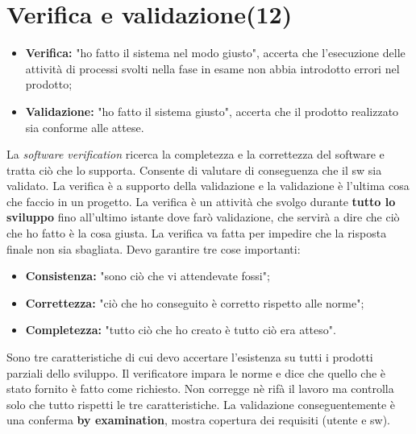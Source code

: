 



\section{Verifica e validazione(12)}


\begin{itemize}

	\item \textbf{Verifica:} "ho fatto il sistema nel modo giusto", accerta che l'esecuzione delle attività di processi svolti nella fase in esame non abbia introdotto errori nel prodotto;
	\item \textbf{Validazione:} "ho fatto il sistema giusto", accerta che il prodotto realizzato sia conforme alle attese.

\end{itemize}

La \textit{software verification} ricerca la completezza e la correttezza del software e tratta ciò che lo supporta. Consente di valutare di conseguenza che il sw sia validato. La verifica è a supporto della validazione e la validazione è l'ultima cosa che faccio in un progetto. La verifica è un attività che svolgo durante \textbf{tutto lo sviluppo} fino all'ultimo istante dove farò validazione, che servirà a dire che ciò che ho fatto è la cosa giusta. La verifica va fatta per impedire che la risposta finale non sia sbagliata. Devo garantire tre cose importanti:

\begin{itemize}

	\item \textbf{Consistenza:} "sono ciò che vi attendevate fossi";
	\item \textbf{Correttezza:} "ciò che ho conseguito è corretto rispetto alle norme";
	\item \textbf{Completezza:} "tutto ciò che ho creato è tutto ciò era atteso".

\end{itemize}

Sono tre caratteristiche di cui devo accertare l'esistenza su tutti i prodotti parziali dello sviluppo. Il verificatore impara le norme e dice che quello che è stato fornito è fatto come richiesto. Non corregge nè rifà il lavoro ma controlla solo che tutto rispetti le tre caratteristiche. La validazione conseguentemente è una conferma \textbf{by examination}, mostra copertura dei requisiti (utente e sw).

